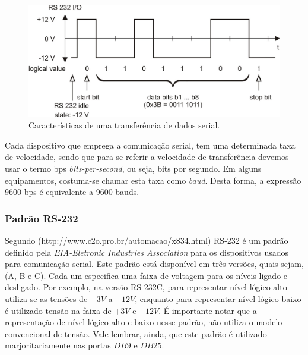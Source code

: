 \documentclass[12pt]{article}
\begin{document}
\begin{figure}[h]
\centering
\includegraphics[width=.5\textwidth]{img/Fig10rs232.jpg}
\caption{Características de uma transferência de dados serial.}
\label{fig:cserial}
\end{figure}



Cada dispositivo que emprega a comunicação serial, tem uma determinada taxa de velocidade, sendo que para se referir a velocidade de transferência devemos usar o termo bps \textit{bits-per-second}, ou seja, bits por segundo. Em alguns equipamentos, costuma-se chamar esta taxa  como \textit{baud}. Desta forma, a expressão 9600 bps é equivalente a 9600 bauds.

\subsubsection{Padrão RS-232}
Segundo (http://www.c2o.pro.br/automacao/x834.html) RS-232 é um padrão definido pela \textit{EIA-Eletronic Industries Association} para os dispositivos usados para comunicação serial. Este padrão está disponível em três versões, quais sejam, (A, B e C). Cada um especifica uma faixa de voltagem para os níveis ligado e desligado. Por exemplo, na versão RS-232C, para representar  nível lógico alto utiliza-se as tensões de $-3V$ a $-12V$, enquanto para representar nível lógico baixo é utilizado tensão na faixa de $+3V$ e $+12V$. É importante notar que a representação de nível lógico alto e baixo nesse padrão, não utiliza o modelo convencional de tensão. Vale lembrar, ainda, que este padrão é utilizado marjoritariamente nas portas $DB9$ e $DB25$.  
\end{document}
